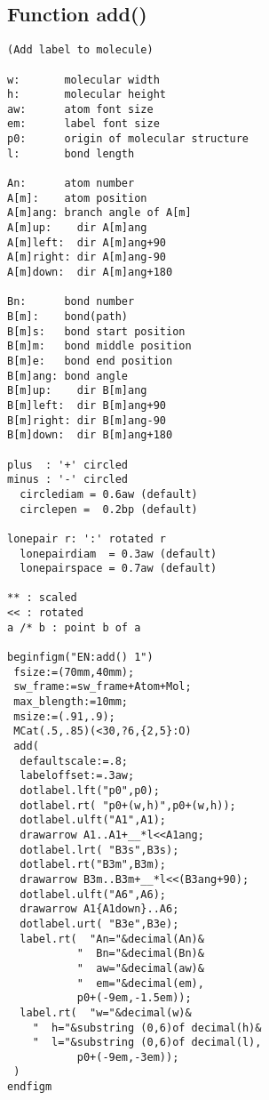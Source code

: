 \documentclass[a4paper]{article}
\begin{document}
\subsection{Function add()}
%
%
%
%
%
%
%
%
%
%
%
%
%
%
\index{/*}%
\index{**}%
\index{\textgreater\textgreater}%
%
%
%
%
%
%
%
%
%
%
%
%
%
%
%
%
%
%
%
\begin{verbatim}
(Add label to molecule)

w:       molecular width
h:       molecular height
aw:      atom font size
em:      label font size
p0:      origin of molecular structure
l:       bond length

An:      atom number
A[m]:    atom position
A[m]ang: branch angle of A[m]
A[m]up:    dir A[m]ang
A[m]left:  dir A[m]ang+90
A[m]right: dir A[m]ang-90
A[m]down:  dir A[m]ang+180

Bn:      bond number
B[m]:    bond(path)
B[m]s:   bond start position
B[m]m:   bond middle position
B[m]e:   bond end position
B[m]ang: bond angle
B[m]up:    dir B[m]ang
B[m]left:  dir B[m]ang+90
B[m]right: dir B[m]ang-90
B[m]down:  dir B[m]ang+180

plus  : '+' circled
minus : '-' circled
  circlediam = 0.6aw (default)
  circlepen =  0.2bp (default)

lonepair r: ':' rotated r
  lonepairdiam  = 0.3aw (default)
  lonepairspace = 0.7aw (default)

** : scaled
<< : rotated
a /* b : point b of a

beginfigm("EN:add() 1")
 fsize:=(70mm,40mm);
 sw_frame:=sw_frame+Atom+Mol;
 max_blength:=10mm;
 msize:=(.91,.9);
 MCat(.5,.85)(<30,?6,{2,5}:O)
 add(
  defaultscale:=.8;
  labeloffset:=.3aw;
  dotlabel.lft("p0",p0);
  dotlabel.rt( "p0+(w,h)",p0+(w,h));
  dotlabel.ulft("A1",A1);
  drawarrow A1..A1+__*l<<A1ang;
  dotlabel.lrt( "B3s",B3s);
  dotlabel.rt("B3m",B3m);
  drawarrow B3m..B3m+__*l<<(B3ang+90);
  dotlabel.ulft("A6",A6);
  drawarrow A1{A1down}..A6;
  dotlabel.urt( "B3e",B3e);
  label.rt(  "An="&decimal(An)&
           "  Bn="&decimal(Bn)&
           "  aw="&decimal(aw)&
           "  em="&decimal(em),
           p0+(-9em,-1.5em));
  label.rt(  "w="&decimal(w)&
    "  h="&substring (0,6)of decimal(h)&
    "  l="&substring (0,6)of decimal(l),
           p0+(-9em,-3em));
 )
endfigm
\end{verbatim}
\end{document}
